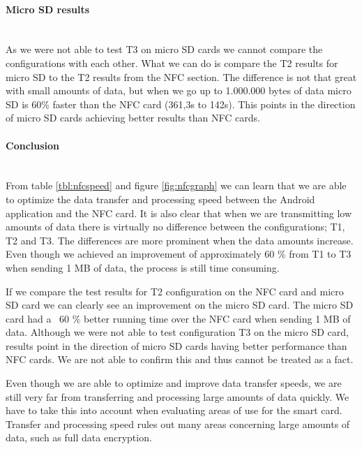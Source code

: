 \newpage
\paragraph{Micro SD results}\mbox{}\\

As we were not able to test T3 on micro SD cards we cannot compare the configurations with each other. What we can do is compare the T2 results for micro SD to the T2 results from the NFC section. The difference is not that great with small amounts of data, but when we go up to 1.000.000 bytes of data micro SD is 60\% faster than the NFC card (361,3s to 142s). This points in the direction of micro SD cards achieving better results than NFC cards.

\paragraph{Conclusion}\mbox{}\\
From table \ref{tbl:nfcspeed} and figure \ref{fig:nfcgraph} we can learn that we are able to optimize the data transfer and processing speed between the Android application and the NFC card. It is also clear that when we are transmitting low amounts of data there is virtually no difference between the configurations; T1, T2 and T3. The differences are more prominent when the data amounts increase. Even though we achieved an improvement of approximately 60 \% from T1 to T3 when sending 1 MB of data, the process is still time consuming.

If we compare the test results for T2 configuration on the NFC card and micro SD card we can clearly see an improvement on the micro SD card. The micro SD card had a ~60 \%  better running time over the NFC card when sending 1 MB of data. Although we were not able to test configuration T3 on the micro SD card, results point in the direction of micro SD cards having better performance than NFC cards. We are not able to confirm this and thus cannot be treated as a fact.

Even though we are able to optimize and improve data transfer speeds, we are still very far from transferring and processing large amounts of data quickly. We have to take this into account when evaluating areas of use for the smart card. Transfer and processing speed rules out many areas concerning large amounts of data, such as full data encryption.
